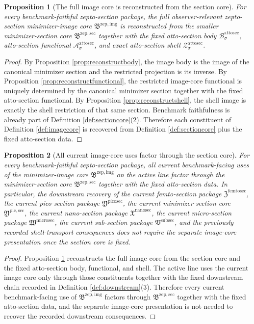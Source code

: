 \documentclass[11pt]{article}
\newcommand{\SubSectionPackage}{\mathfrak V^{\mathrm{subsec}}}
\newcommand{\MicroSectionPackage}{\mathfrak W^{\mathrm{microsec}}}
\newcommand{\NanoSectionPackage}{\mathfrak X^{\mathrm{nanosec}}}
\newcommand{\PicoSectionPackage}{\mathfrak Y^{\mathrm{picosec}}}
\newcommand{\PicoMinSectionCore}{\mathfrak Y^{\mathrm{pic,sec}}}
\newcommand{\FemtoSectionPackage}{\mathfrak Z^{\mathrm{femtosec}}}
\newcommand{\AttoSectionBody}[1]{\mathcal B_{#1}^{\mathrm{attosec}}}
\newcommand{\AttoSectionFunctional}[1]{\mathscr A_{#1}^{\mathrm{attosec}}}
\newcommand{\AttoSectionShell}[1]{\mathcal Z_{#1}^{\mathrm{attosec}}}
\newcommand{\ZeptoImageCore}{\mathfrak B^{\mathrm{zep,img}}}
\newcommand{\ZeptoMinSectionCore}{\mathfrak B^{\mathrm{zep,sec}}}
\newtheorem{proposition}{Proposition}
\begin{document}
\begin{proposition}[The full image core is reconstructed from the section core]
\label{prop:reconstructimage}
For every benchmark-faithful zepto-section package, the full observer-relevant zepto-section minimizer-image core \(\ZeptoImageCore\) is reconstructed from the smaller minimizer-section core \(\ZeptoMinSectionCore\) together with the fixed atto-section body \(\AttoSectionBody{\sigma}\), atto-section functional \(\AttoSectionFunctional{\sigma}\), and exact atto-section shell \(\AttoSectionShell{\sigma}\).
\end{proposition}

\begin{proof}
By Proposition \ref{prop:reconstructbody}, the image body is the image of the canonical minimizer section and the restricted projection is its inverse. By Proposition \ref{prop:reconstructfunctional}, the restricted image-core functional is uniquely determined by the canonical minimizer section together with the fixed atto-section functional. By Proposition \ref{prop:reconstructshell}, the shell image is exactly the shell restriction of that same section. Benchmark faithfulness is already part of Definition \ref{def:sectioncore}(2). Therefore each constituent of Definition \ref{def:imagecore} is recovered from Definition \ref{def:sectioncore} plus the fixed atto-section data.
\end{proof}

\begin{proposition}[All current image-core uses factor through the section core]
\label{prop:downstream}
For every benchmark-faithful zepto-section package, all current benchmark-facing uses of the minimizer-image core \(\ZeptoImageCore\) on the active line factor through the minimizer-section core \(\ZeptoMinSectionCore\) together with the fixed atto-section data. In particular, the downstream recovery of the current femto-section package \(\FemtoSectionPackage\), the current pico-section package \(\PicoSectionPackage\), the current minimizer-section core \(\PicoMinSectionCore\), the current nano-section package \(\NanoSectionPackage\), the current micro-section package \(\MicroSectionPackage\), the current sub-section package \(\SubSectionPackage\), and the previously recorded shell-transport consequences does not require the separate image-core presentation once the section core is fixed.
\end{proposition}

\begin{proof}
Proposition \ref{prop:reconstructimage} reconstructs the full image core from the section core and the fixed atto-section body, functional, and shell. The active line uses the current image core only through those constituents together with the fixed downstream chain recorded in Definition \ref{def:downstream}(3). Therefore every current benchmark-facing use of \(\ZeptoImageCore\) factors through \(\ZeptoMinSectionCore\) together with the fixed atto-section data, and the separate image-core presentation is not needed to recover the recorded downstream consequences.
\end{proof}
\end{document}
